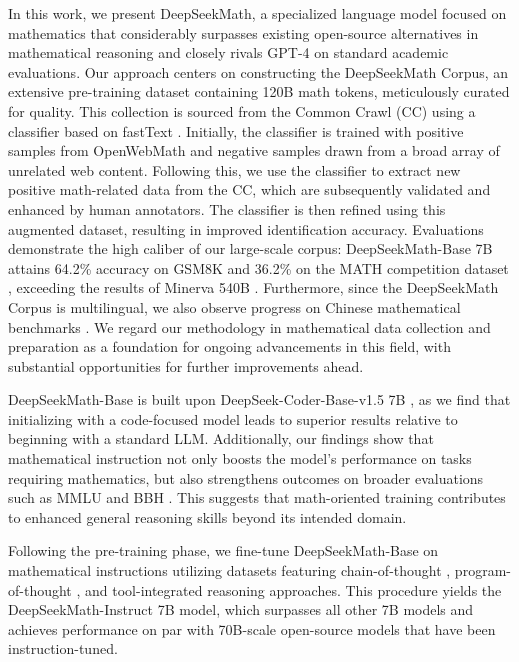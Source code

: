In this work, we present DeepSeekMath, a specialized language model focused on mathematics that considerably surpasses existing open-source alternatives in mathematical reasoning and closely rivals GPT-4 on standard academic evaluations. Our approach centers on constructing the DeepSeekMath Corpus, an extensive pre-training dataset containing 120B math tokens, meticulously curated for quality. This collection is sourced from the Common Crawl (CC) using a classifier based on fastText \citep{joulin2016fasttext}. Initially, the classifier is trained with positive samples from OpenWebMath \citep{openwebmath} and negative samples drawn from a broad array of unrelated web content. Following this, we use the classifier to extract new positive math-related data from the CC, which are subsequently validated and enhanced by human annotators. The classifier is then refined using this augmented dataset, resulting in improved identification accuracy. Evaluations demonstrate the high caliber of our large-scale corpus: DeepSeekMath-Base 7B attains 64.2\% accuracy on GSM8K \citep{gsm8k} and 36.2\% on the MATH competition dataset \citep{MATH}, exceeding the results of Minerva 540B \citep{minerva}. Furthermore, since the DeepSeekMath Corpus is multilingual, we also observe progress on Chinese mathematical benchmarks \citep{wei2023cmath,agieval}. We regard our methodology in mathematical data collection and preparation as a foundation for ongoing advancements in this field, with substantial opportunities for further improvements ahead.

DeepSeekMath-Base is built upon DeepSeek-Coder-Base-v1.5 7B \citep{deepseek-coder}, as we find that initializing with a code-focused model leads to superior results relative to beginning with a standard LLM. Additionally, our findings show that mathematical instruction not only boosts the model’s performance on tasks requiring mathematics, but also strengthens outcomes on broader evaluations such as MMLU \citep{mmlu} and BBH \citep{bbh}. This suggests that math-oriented training contributes to enhanced general reasoning skills beyond its intended domain.

Following the pre-training phase, we fine-tune DeepSeekMath-Base on mathematical instructions utilizing datasets featuring chain-of-thought \citep{cot}, program-of-thought \citep{pot,pal}, and tool-integrated reasoning \citep{tora} approaches. This procedure yields the DeepSeekMath-Instruct 7B model, which surpasses all other 7B models and achieves performance on par with 70B-scale open-source models that have been instruction-tuned.

